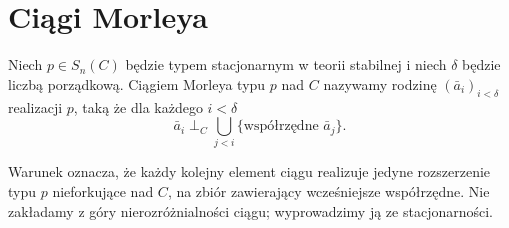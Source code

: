 \section{Ciągi Morleya}

\begin{definicja}
\label{def:mod-morley-sequence}
Niech $p\in S_n(C)$ będzie typem stacjonarnym
w teorii stabilnej i niech $\delta$ będzie
liczbą porządkową. Ciągiem Morleya typu $p$
nad $C$ nazywamy rodzinę $(\bar a_i)_{i<\delta}$
realizacji $p$, taką że dla każdego $i<\delta$
\[
\bar a_i\mathrel{\perp_C}
\bigcup_{j<i}\{\text{współrzędne }\bar a_j\}.
\]
\end{definicja}

Warunek oznacza, że każdy kolejny element
ciągu realizuje jedyne rozszerzenie
typu $p$ nieforkujące nad $C$, na zbiór
zawierający wcześniejsze współrzędne.
Nie zakładamy z góry nierozróżnialności
ciągu; wyprowadzimy ją ze stacjonarności.

